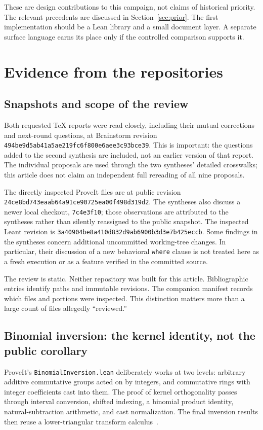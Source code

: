 \documentclass[11pt,a4paper]{article}
\newcommand{\code}[1]{\nolinkurl{#1}}
\theoremstyle{definition}
\begin{document}
These are design contributions to this campaign, not claims of historical priority.
The relevant precedents are discussed in Section~\ref{sec:prior}. The first
implementation should be a Lean library and a small document layer. A separate
surface language earns its place only if the controlled comparison supports it.

\section{Evidence from the repositories}\label{sec:evidence}
\subsection{Snapshots and scope of the review}
Both requested TeX reports were read closely, including their mutual corrections
and next-round questions, at Brainstorm revision
\code{494be9d5ab41a5ae219fc6f800e6aee3c93bce39}. This is important: the questions
added to the second synthesis are included, not an earlier version of that report.
The individual proposals are used through the two syntheses' detailed crosswalks;
this article does not claim an independent full rereading of all nine proposals.

The directly inspected ProveIt files are at public revision
\code{24ce8bd743eaab64a91ce90725ea00f498d319d2}. The syntheses also discuss a newer
local checkout, \code{7c4e3f10}; those observations are attributed to the syntheses
rather than silently reassigned to the public snapshot. The inspected Leant
revision is \code{3a40904be8a410d832d9ab6900b3d3e7b425eccb}. Some findings in the
syntheses concern additional uncommitted working-tree changes. In particular,
their discussion of a new behavioral \code{where} clause is not treated here as a
fresh execution or as a feature verified in the committed source.

The review is static. Neither repository was built for this article. Bibliographic
entries identify paths and immutable revisions. The companion manifest records
which files and portions were inspected. This distinction matters more than a
large count of files allegedly ``reviewed.''

\subsection{Binomial inversion: the kernel identity, not the public corollary}
ProveIt's \code{BinomialInversion.lean} deliberately works at two levels: arbitrary
additive commutative groups acted on by integers, and commutative rings with
integer coefficients cast into them. The proof of kernel orthogonality passes
through interval conversion, shifted indexing, a binomial product identity,
natural-subtraction arithmetic, and cast normalization. The final inversion
results then reuse a lower-triangular transform calculus~\cite{p-binomial}.
\end{document}
